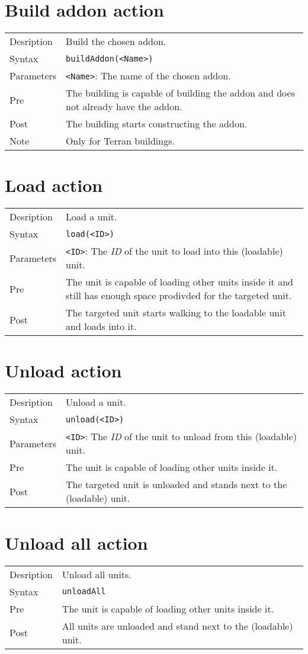 \section{Build addon action}
\begin{tabularx}{\textwidth}{lX}
 Desription & Build the chosen addon. \\
 Syntax & \verb|buildAddon(<Name>)| \\
 Parameters & \verb|<Name>|: The name of the chosen addon.\\
 Pre & The building is capable of building the addon and does not already have the addon. \\
 Post & The building starts constructing the addon. \\
 Note & Only for Terran buildings.
\end{tabularx}

\section{Load action}
\begin{tabularx}{\textwidth}{lX}
 Desription & Load a unit. \\
 Syntax & \verb|load(<ID>)| \\
 Parameters & \verb|<ID>|: The \textit{ID} of the unit to load into this (loadable) unit.\\
 Pre & The unit is capable of loading other units inside it and still has enough space prodivded for the targeted unit. \\
 Post & The targeted unit starts walking to the loadable unit and loads into it.
\end{tabularx}

\section{Unload action}
\begin{tabularx}{\textwidth}{lX}
 Desription & Unload a unit. \\
 Syntax & \verb|unload(<ID>)| \\
 Parameters & \verb|<ID>|: The \textit{ID} of the unit to unload from this (loadable) unit.\\
 Pre & The unit is capable of loading other units inside it. \\
 Post & The targeted unit is unloaded and stands next to the (loadable) unit.
\end{tabularx}

\section{Unload all action}
\begin{tabularx}{\textwidth}{lX}
 Desription & Unload all units. \\
 Syntax & \verb|unloadAll| \\
 Pre & The unit is capable of loading other units inside it. \\
 Post & All units are unloaded and stand next to the (loadable) unit.
\end{tabularx}

